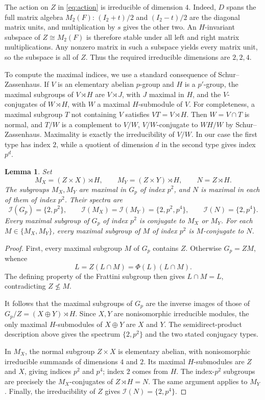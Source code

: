 \documentclass[11pt]{amsart}
\newtheorem{lemma}[theorem]{Lemma}
\newcommand{\I}{\mathcal I}
\begin{document}
The action on $Z$ in \eqref{eq:action} is irreducible of dimension $4$.
Indeed, $D$ spans the full matrix algebra $M_2(F)$: $(I_2+t)/2$ and
$(I_2-t)/2$ are the diagonal matrix units, and multiplication by $s$ gives
the other two. An $H$-invariant subspace of $Z\cong M_2(F)$ is therefore
stable under all left and right matrix multiplications. Any nonzero matrix
in such a subspace yields every matrix unit, so the subspace is all of $Z$.
Thus the required irreducible dimensions are $2,2,4$.

To compute the maximal indices, we use a standard consequence of
Schur--Zassenhaus. If $V$ is an elementary abelian $p$-group and $H$ is a
$p'$-group, the maximal subgroups of $V\rtimes H$ are $V\rtimes J$, with
$J$ maximal in $H$, and the $V$-conjugates of $W\rtimes H$, with $W$ a
maximal $H$-submodule of $V$. For completeness, a maximal subgroup $T$ not
containing $V$ satisfies $VT=V\rtimes H$. Then $W=V\cap T$ is normal,
and $T/W$ is a complement to $V/W$, $V/W$-conjugate to $WH/W$ by
Schur--Zassenhaus. Maximality is exactly the irreducibility of $V/W$.
In our case the first type has index $2$, while a quotient of dimension $d$
in the second type gives index $p^d$.

\begin{lemma}\label{lem:spectra}
Set
\[
 M_X=(Z\times X)\rtimes H,\qquad
 M_Y=(Z\times Y)\rtimes H,\qquad N=Z\rtimes H.
\]
The subgroups $M_X,M_Y$ are maximal in $G_p$ of index $p^2$, and $N$ is
maximal in each of them of index $p^2$. Their spectra are
\[
 \I(G_p)=\{2,p^2\},\qquad
 \I(M_X)=\I(M_Y)=\{2,p^2,p^4\},\qquad
 \I(N)=\{2,p^4\}.
\]
Every maximal subgroup of $G_p$ of index $p^2$ is conjugate to $M_X$ or
$M_Y$. For each $M\in\{M_X,M_Y\}$, every maximal subgroup of $M$ of
index $p^2$ is $M$-conjugate to $N$.
\end{lemma}

\begin{proof}
First, every maximal subgroup $M$ of $G_p$ contains $Z$. Otherwise
$G_p=ZM$, whence
\[
 L=Z(L\cap M)=\Phi(L)(L\cap M).
\]
The defining property of the Frattini subgroup then gives $L\cap M=L$,
contradicting $Z\nleq M$.

It follows that the maximal subgroups of $G_p$ are the inverse images of
those of $G_p/Z=(X\oplus Y)\rtimes H$. Since $X,Y$ are nonisomorphic
irreducible modules, the only maximal $H$-submodules of $X\oplus Y$ are
$X$ and $Y$. The semidirect-product description above gives the spectrum
$\{2,p^2\}$ and the two stated conjugacy types.

In $M_X$, the normal subgroup $Z\times X$ is elementary abelian, with
nonisomorphic irreducible summands of dimensions $4$ and $2$. Its maximal
$H$-submodules are $Z$ and $X$, giving indices $p^2$ and $p^4$;
index $2$ comes from $H$. The index-$p^2$ subgroups are precisely the
$M_X$-conjugates of $Z\rtimes H=N$. The same argument applies to $M_Y$.
Finally, the irreducibility of $Z$ gives $\I(N)=\{2,p^4\}$.
\end{proof}
\end{document}
